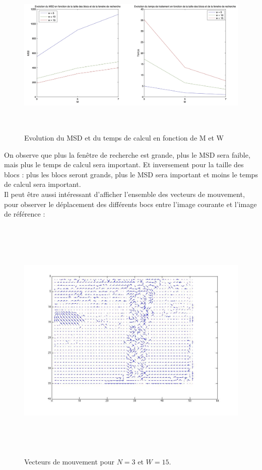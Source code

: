 \documentclass[a4paper, 12pt]{article}
\begin{document}
\begin{figure}[H]
	\centering
	\includegraphics[height=8cm]{../Resultats/Garden/garden_graph.jpg}
	\caption{Evolution du MSD et du temps de calcul en fonction de M et W}
	\label{fig:garden_graph}
\end{figure}

On observe que plus la fenêtre de recherche est grande, plus le MSD sera faible, mais plus le temps de calcul sera important. Et inversement pour la taille des blocs : plus les blocs seront grands, plus le MSD sera important et moins le temps de calcul sera important. \\

Il peut être aussi intéressant d'afficher l'ensemble des vecteurs de mouvement, pour observer le déplacement des différents bocs entre l'image courante et l'image de référence :

\begin{figure}[H]
	\centering
	\includegraphics[height=12cm]{../Resultats/Garden/garden_vec_n_3_w_15.jpg}
	\caption{Vecteurs de mouvement pour $N=3$ et $W=15$.}
	\label{fig:garden_vec}
\end{figure}
\end{document}
